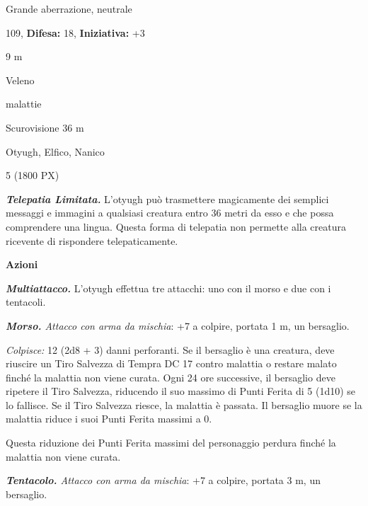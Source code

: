 \begin{multicols}{2}
{
\noindent
\begin{description}[noitemsep, topsep=0pt, parsep=0pt, partopsep=0pt, leftmargin=0cm, labelwidth=2.2cm]
	\item[\textbf{Taglia/Tipo:}] Grande aberrazione, neutrale
	\item[\textbf{Caratt.:}] 
	\item[\textbf{Punti Ferita:}] 109,  \textbf{Difesa:} 18,  \textbf{Iniziativa:} +3
	\item[\textbf{Movimento:}] 9 m
	\item[\textbf{Tiri Salvez.:}] 
	\item[\textbf{Imm. Danni:}] Veleno
	\item[\textbf{Immunità:}] malattie
	\item[\textbf{Sensi:}] Scurovisione 36 m
	\item[\textbf{Linguaggi:}] Otyugh, Elfico, Nanico
	\item[\textbf{Sfida:}] 5 (1800 PX)\smallskip
\end{description}

\emph{\textbf{Telepatia Limitata.}} L'otyugh può trasmettere magicamente dei semplici messaggi e immagini a qualsiasi creatura entro 36 metri da esso e che possa comprendere una lingua. Questa forma di telepatia non permette alla creatura ricevente di rispondere telepaticamente.

\textbf{Azioni}

\emph{\textbf{Multiattacco.}} L'otyugh effettua tre attacchi: uno con il morso e due con i tentacoli.

\emph{\textbf{Morso.} Attacco con arma da mischia}: +7 a colpire, portata 1 m, un bersaglio.

\emph{Colpisce:} 12 (2d8 + 3) danni perforanti. Se il bersaglio è una creatura, deve riuscire un Tiro Salvezza di Tempra DC 17 contro malattia o restare malato finché la malattia non viene curata. Ogni 24 ore successive, il bersaglio deve ripetere il Tiro Salvezza, riducendo il suo massimo di Punti Ferita di 5 (1d10) se lo fallisce. Se il Tiro Salvezza riesce, la malattia è passata. Il bersaglio muore se la malattia riduce i suoi Punti Ferita massimi a 0.

Questa riduzione dei Punti Ferita massimi del personaggio perdura finché la malattia non viene curata.

\emph{\textbf{Tentacolo.} Attacco con arma da mischia}: +7 a colpire, portata 3 m, un bersaglio.

}
\end{multicols}
